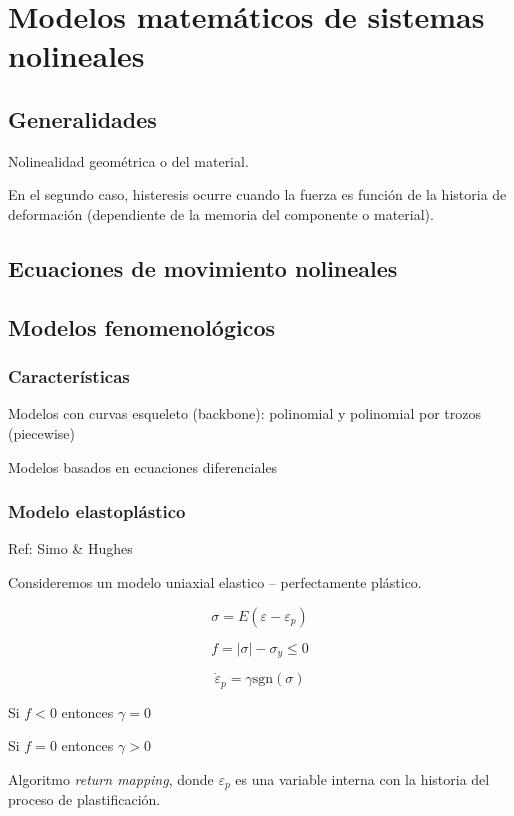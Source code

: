 \chapter{Modelos matemáticos de sistemas nolineales}

\section{Generalidades}

Nolinealidad geométrica o del material.

En el segundo caso, histeresis ocurre cuando la fuerza es función de la historia de deformación (dependiente de la memoria del componente o material).

\section{Ecuaciones de movimiento nolineales}


\section{Modelos fenomenológicos}

\textcite{wang2023modeldrivendatadriven}

\subsection{Características}

Modelos con curvas esqueleto (backbone): polinomial y polinomial por trozos (piecewise)

Modelos basados en ecuaciones diferenciales

\subsection{Modelo elastoplástico}

Ref: Simo \& Hughes

Consideremos un modelo uniaxial elastico -- perfectamente plástico.

$$\sigma = E (\varepsilon - \varepsilon_p)$$

$$f = |\sigma| - \sigma_y \leq 0$$

$$\dot{\varepsilon}_p = \gamma \text{sgn}(\sigma)$$

Si $f < 0$ entonces $\gamma = 0$

Si $f = 0$ entonces $\gamma > 0$

Algoritmo \emph{return mapping}, donde $\varepsilon_p$ es una variable interna con la historia del proceso de plastificación.

